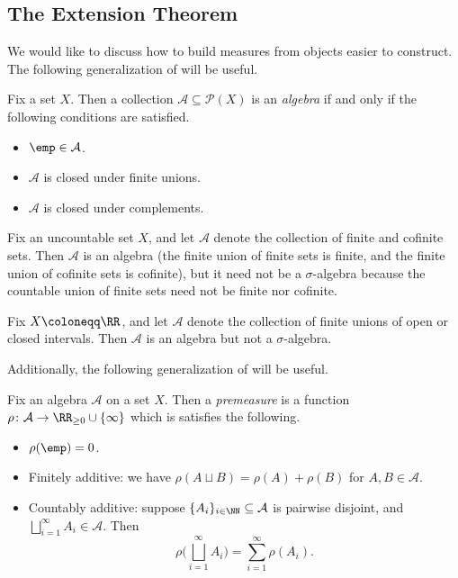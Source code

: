 \documentclass[../notes.tex]{subfiles}
\begin{document}
\subsection{The Extension Theorem}
We would like to discuss how to build measures from objects easier to construct. The following generalization of  will be useful.
\begin{definition}[algebra]
	Fix a set $X$. Then a collection $\mathcal A\subseteq\mathcal P(X)$ is an \textit{algebra} if and only if the following conditions are satisfied.
	\begin{itemize}
		\item $\emp\in\mathcal A$.
		\item $\mathcal A$ is closed under finite unions.
		\item $\mathcal A$ is closed under complements.
	\end{itemize}
\end{definition}
\begin{example}
	Fix an uncountable set $X$, and let $\mathcal A$ denote the collection of finite and cofinite sets. Then $\mathcal A$ is an algebra (the finite union of finite sets is finite, and the finite union of cofinite sets is cofinite), but it need not be a $\sigma$-algebra because the countable union of finite sets need not be finite nor cofinite.
\end{example}
\begin{example}
	Fix $X\coloneqq\RR$, and let $\mathcal A$ denote the collection of finite unions of open or closed intervals. Then $\mathcal A$ is an algebra but not a $\sigma$-algebra.
\end{example}
Additionally, the following generalization of  will be useful.
\begin{definition}[premeasure]
	Fix an algebra $\mathcal A$ on a set $X$. Then a \textit{premeasure} is a function $\rho\colon\mathcal A\to\RR_{\ge0}\cup\{\infty\}$ which is satisfies the following.
	\begin{itemize}
		\item $\rho(\emp)=0$.
		\item Finitely additive: we have $\rho(A\sqcup B)=\rho(A)+\rho(B)$ for $A,B\in\mathcal A$.
		\item Countably additive: suppose $\{A_i\}_{i\in\NN}\subseteq\mathcal A$ is pairwise disjoint, and $\bigsqcup_{i=1}^\infty A_i\in\mathcal A$. Then
		\[\rho\Bigg(\bigsqcup_{i=1}^\infty A_i\Bigg)=\sum_{i=1}^\infty\rho(A_i).\]
	\end{itemize}
\end{definition}
\end{document}
